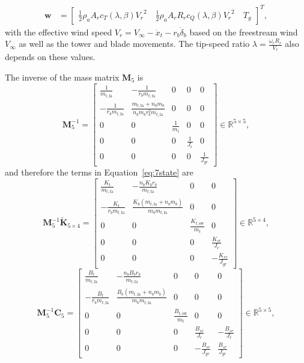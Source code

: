     \begin{align*}
        \bm{w} & =\begin{bmatrix}
            \frac{1}{2}\rho_a A_rc_{T}(\lambda
            ,\beta){V_r}^{2} \quad
            \frac{1}{2}\rho_a A_rR_rc_Q(\lambda,\beta){V_r}^{2} 
            \quad T_g
        \end{bmatrix}^T,  
    \end{align*}
    with the effective wind speed $V_r = V_{\infty} -\dot{x}_t- r_b\dot{\delta}_b$ based on the freestream wind $V_{\infty}$ as well as the tower and blade movements. The tip-speed ratio $\lambda= \frac {\omega_{r}R_r}{V_r}$ also depends on these values.
    
    The inverse of the mass matrix $\mathbf{M}_5$ is
    \[
    \mathbf{M}_5^{-1} = \begin{bmatrix}
        \frac{1}{m_{t,\text{fa}}} & -\frac{1} {r_b m_{t,\text{fa}}} & 0 & 0 & 0\\
        -\frac{1}{r_b m_{t,\text{fa}}} & \frac{m_{t,\text{fa}} +n_b m_b}{n_b m_b r^2_b m_{t,\text{fa}}} & 0 & 0 & 0\\
        0 & 0 & \frac{1}{m_t} & 0 &0\\
        0 & 0 & 0 & \frac{1}{J_r} & 0\\
        0 & 0 & 0 & 0 & \frac{1}{J_{gr}}
    \end{bmatrix} \in \mathbb{R}^{5 \times 5},
    \]
    and therefore the terms in Equation~\eqref{eq:7state} are 
    \[
    \mathbf{M}_5^{-1}\tilde{\mathbf{K}}_{5 \times 4} =
    \begin{bmatrix}
        \frac{K_t}{m_{t,\text{fa}}} &- \frac{n_b K_b r_b} {m_{t,\text{fa}}} & 0 & 0 \\
        -\frac{K_t}{r_b m_{t,\text{fa}}} & \frac{K_b(m_{t,\text{fa}} + n_b m_b)}{m_b m_{t,\text{fa}}} & 0 & 0 \\
        0 & 0 & \frac{K_{t,\text{sw}}}{m_t} & 0 \\
        0 & 0 & 0 & \frac{K_{sr}}{J_r} \\
        0 & 0 & 0 & -\frac{K_{sr}}{J_{gr}}
    \end{bmatrix} \in \mathbb{R}^{5 \times 4},
    \]
    \[
    \mathbf{M}_5^{-1}\mathbf{C}_{5} = \begin{bmatrix}
        \frac{B_t}{m_{t,\text{fa}}} & - \frac{n_b B_b r_b} {m_{t,\text{fa}}} & 0 & 0 & 0\\
        -\frac{B_t}{r_b m_{t,\text{fa}}} & \frac{B_b(m_{t,\text{fa}} + n_b m_b)}{m_b m_{t,\text{fa}}} & 0 & 0 & 0\\
        0 & 0 & \frac{B_{t,\text{sw}}}{m_t} & 0 &0\\
        0 & 0 & 0 & \frac{B_{sr}}{J_r} & -\frac{B_{sr}}{J_r}\\
        0 & 0 & 0 & -\frac{B_{sr}}{J_{gr}} & \frac{B_{sr}}{J_{gr}}
    \end{bmatrix} \in \mathbb{R}^{5 \times 5},
    \]

